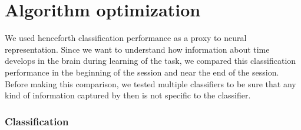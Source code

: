 \chapter{Algorithm optimization}
\label{chap:results}

We used henceforth classification performance as a proxy to neural representation. Since we want to understand how information about time develops in the brain during learning of the task, we compared this classification performance in the beginning of the session and near the end of the session. Before making this comparison, we tested multiple classifiers to be sure that any kind of information captured by then is not specific to the classifier.
\subsection{Classification}

